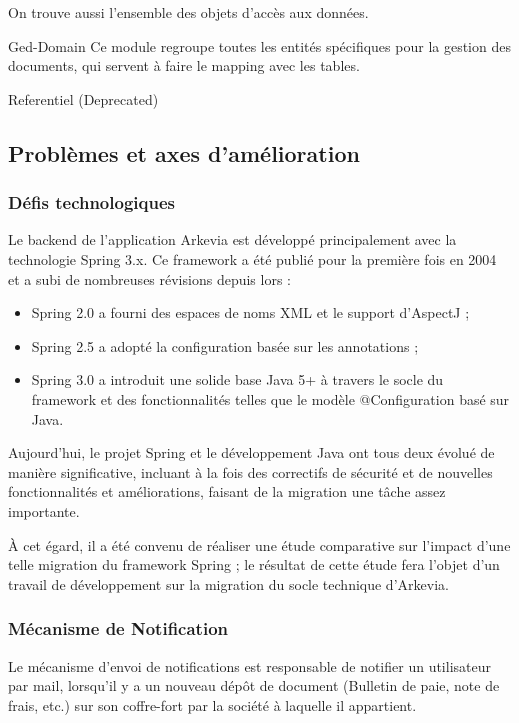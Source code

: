 On trouve aussi l'ensemble des objets d'accès aux données.

Ged-Domain
Ce module regroupe toutes les entités spécifiques pour la gestion des documents, qui servent à faire le mapping avec les tables.


Referentiel
(Deprecated)






\subsection{Problèmes et axes d'amélioration}
\subsubsection{Défis technologiques}
Le backend de l'application Arkevia est développé principalement avec la technologie Spring 3.x. Ce framework a été publié pour la première fois en 2004 et a subi de nombreuses révisions depuis lors : 
\begin{itemize}
    \item Spring 2.0 a fourni des espaces de noms XML et le support d'AspectJ ; 
    \item Spring 2.5 a adopté la configuration basée sur les annotations ; 
    \item Spring 3.0 a introduit une solide base Java 5+ à travers le socle du framework et des fonctionnalités telles que le modèle @Configuration basé sur Java.\\
\end{itemize}

Aujourd'hui, le projet Spring et le développement Java ont tous deux évolué de manière significative, incluant à la fois des correctifs de sécurité et de nouvelles fonctionnalités et améliorations, faisant de la migration une tâche assez importante.

À cet égard, il a été convenu de réaliser une étude comparative sur l'impact d'une telle migration du framework Spring ; le résultat de cette étude fera l'objet d'un travail de développement sur la migration du socle technique d'Arkevia.



\subsubsection{Mécanisme de Notification}
Le mécanisme d'envoi de notifications est responsable de notifier un utilisateur par mail, lorsqu'il y a un nouveau dépôt de document (Bulletin de paie, note de frais, etc.) sur son coffre-fort par la société à laquelle il appartient.\\

